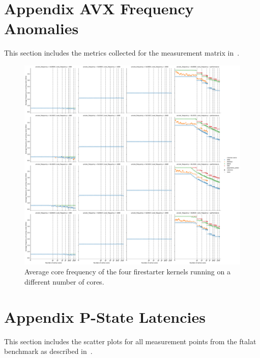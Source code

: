 %

\chapter{Appendix AVX Frequency Anomalies}
\label{app:avx-frequencies}
This section includes the metrics collected for the measurement matrix in~.

\begin{figure}[]
    \centering
    \includegraphics[width=\columnwidth]{fig/avx-frequency-license-bands-without-isst-core-frequency.pdf}
    \caption{Average core frequency of the four firestarter kernels running on a different number of cores.}
\end{figure}


\chapter{Appendix P-State Latencies}
\label{app:pstate_latencies_scatter_complete}
This section includes the scatter plots for all measurement points from the ftalat benchmark as described in~.

